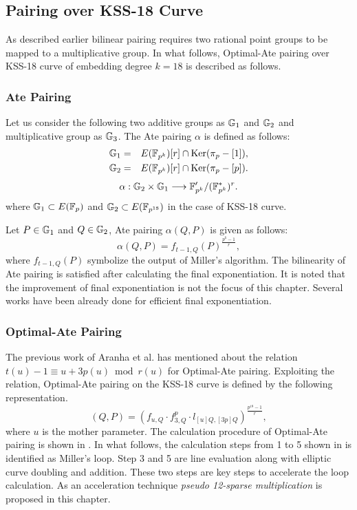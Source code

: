 \subsection{Pairing over KSS-18 Curve }
As described earlier bilinear pairing requires two rational point groups to be mapped to a multiplicative group. In what follows,  Optimal-Ate pairing over KSS-18 curve of embedding degree $k = 18$ is described as follows.
\subsubsection{Ate Pairing} 
Let us consider the following two additive groups as ${\mathbb{G}}_{1}$ and ${\mathbb{G}}_{2}$ and multiplicative group as ${\mathbb{G}}_{3}$. The Ate pairing $\alpha$ is defined as follows:
\begin{eqnarray}
{\mathbb{G}}_{1}&=&E(\mathbb{F}_{p^k})[r]\cap {\rm Ker}(\pi_p-[1])\nonumber,\\
{\mathbb{G}}_{2}&=&E(\mathbb{F}_{p^k})[r]\cap {\rm Ker}(\pi_p-[p])\nonumber.
\end{eqnarray}
\begin{eqnarray}
\alpha:{\mathbb{G}}_{2}\times{\mathbb{G}}_{1}\longrightarrow\mathbb{F}_{p^k}'/(\mathbb{F}_{p^k}^*)^r.
\end{eqnarray}
where ${\mathbb{G}}_{1} \subset E(\mathbb{F}_p)$ and ${\mathbb{G}}_{2} \subset E(\mathbb{F}_{p^{18}})$  in the case of KSS-18 curve.

Let $P \in {\mathbb{G}}_{1}$ and $Q\in{\mathbb{G}}_{2}$, Ate pairing $\alpha(Q,P)$ is given as follows:
\begin{equation}
\alpha(Q,P)=f_{t-1,Q}(P)^{\frac{p^k-1}{r}},
\end{equation}
where $f_{t-1,Q}(P)$ symbolize the output of Miller's algorithm. The bilinearity of Ate pairing is satisfied after calculating the final exponentiation. It is noted that the improvement of final exponentiation is not the focus of this chapter. Several works \cite{EPRINT:ShiTakOka06, PAIRING:SBCDK09a} have been already done for efficient final exponentiation.

\subsubsection{Optimal-Ate Pairing }
The previous work of Aranha et al. \cite{PAIRING:AFKMR12} has mentioned about the relation  $t(u) - 1 \equiv u + 3p(u) \bmod r(u)$ for Optimal-Ate pairing. Exploiting the relation, Optimal-Ate pairing on the KSS-18 curve is defined by the following representation.
\begin{equation}
(Q,P)=(f_{u,Q}\cdot f_{3,Q}^p\cdot l_{[u]Q,[3p]Q})^{\frac{p^{18}-1}{r}},
\end{equation}
where $u$ is the mother parameter. The calculation procedure of Optimal-Ate pairing is shown in . In what follows, the calculation steps from 1 to 5 shown in  is identified as Miller's loop. Step 3 and 5 are line evaluation along with elliptic curve doubling and addition. These two steps are key steps to accelerate the loop calculation. As an acceleration technique  \textit{pseudo 12-sparse multiplication} is proposed in this chapter.
